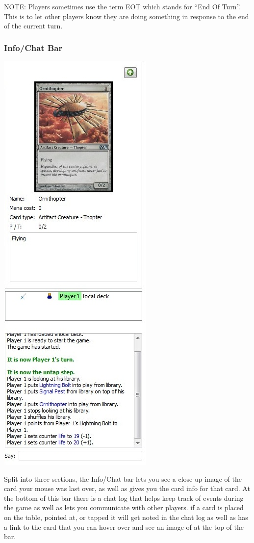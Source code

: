 \documentclass[a4paper]{scrbook}
\begin{document}
NOTE: Players sometimes use the term EOT which stands for “End Of Turn”. This is to let other players know they are doing something in response to the end of the current turn.

\subsubsection{Info/Chat Bar}
\begin{center}
\includegraphics[scale=0.8]{pics/fetcha0de}
\end{center}
Split into three sections, the Info/Chat bar lets you see a close-up image of the card your mouse was last over, as well as gives you the card info for that card. At the bottom of this bar there is a chat log that helps keep track of events during the game as well as lets you communicate with other players. if a card is placed on the table, pointed at, or tapped it will get noted in the chat log as well as has a link to the card that you can hover over and see an image of at the top of the bar.
\end{document}
